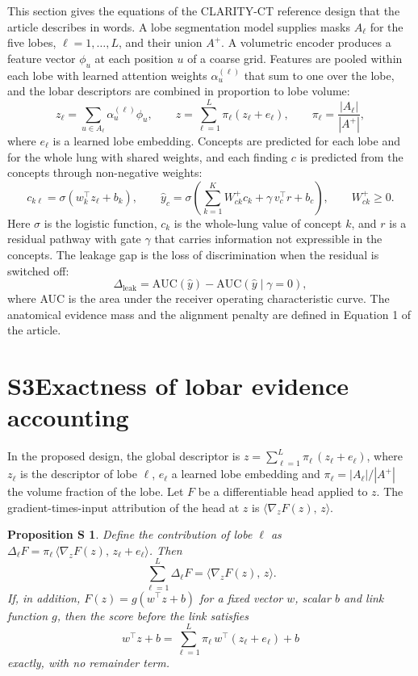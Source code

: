\documentclass[10pt,a4paper]{article}
\newtheorem{proposition}{Proposition S\!}
\theoremstyle{definition}\newtheorem{definition}{Definition S\!}
\theoremstyle{remark}\newtheorem{remark}{Remark S\!}
\begin{document}
This section gives the equations of the CLARITY-CT reference design that the article describes in words. A lobe segmentation model supplies masks $A_\ell$ for the five lobes, $\ell=1,\dots,L$, and their union $A^{+}$. A volumetric encoder produces a feature vector $\phi_u$ at each position $u$ of a coarse grid. Features are pooled within each lobe with learned attention weights $\alpha_u^{(\ell)}$ that sum to one over the lobe, and the lobar descriptors are combined in proportion to lobe volume:
\[
z_\ell=\sum_{u\in A_\ell}\alpha_u^{(\ell)}\phi_u,\qquad z=\sum_{\ell=1}^{L}\pi_\ell\left(z_\ell+e_\ell\right),\qquad \pi_\ell=\frac{|A_\ell|}{|A^{+}|},\tag{S1}
\]
where $e_\ell$ is a learned lobe embedding. Concepts are predicted for each lobe and for the whole lung with shared weights, and each finding $c$ is predicted from the concepts through non-negative weights:
\[
c_{k\ell}=\sigma\left(w_k^{\top}z_\ell+b_k\right),\qquad \hat{y}_c=\sigma\left(\sum_{k=1}^{K}W_{ck}^{+}c_k+\gamma\,v_c^{\top}r+b_c\right),\qquad W_{ck}^{+}\ge 0.\tag{S2}
\]
Here $\sigma$ is the logistic function, $c_k$ is the whole-lung value of concept $k$, and $r$ is a residual pathway with gate $\gamma$ that carries information not expressible in the concepts. The leakage gap is the loss of discrimination when the residual is switched off:
\[
\Delta_{\mathrm{leak}}=\mathrm{AUC}\left(\hat{y}\right)-\mathrm{AUC}\left(\hat{y}\mid\gamma=0\right),\tag{S3}
\]
where AUC is the area under the receiver operating characteristic curve. The anatomical evidence mass and the alignment penalty are defined in Equation 1 of the article.

\section*{S3\quad Exactness of lobar evidence accounting}

In the proposed design, the global descriptor is $z=\sum_{\ell=1}^{L}\pi_\ell\,(z_\ell+e_\ell)$, where $z_\ell$ is the descriptor of lobe $\ell$, $e_\ell$ a learned lobe embedding and $\pi_\ell=|A_\ell|/|A^{+}|$ the volume fraction of the lobe. Let $F$ be a differentiable head applied to $z$. The gradient-times-input attribution of the head at $z$ is $\langle\nabla_z F(z),\,z\rangle$.

\begin{proposition}
Define the contribution of lobe $\ell$ as $\Delta_\ell F=\pi_\ell\,\langle\nabla_z F(z),\,z_\ell+e_\ell\rangle$. Then
\[
\sum_{\ell=1}^{L}\Delta_\ell F=\langle\nabla_z F(z),\,z\rangle .
\]
If, in addition, $F(z)=g\!\left(w^{\top}z+b\right)$ for a fixed vector $w$, scalar $b$ and link function $g$, then the score before the link satisfies
\[
w^{\top}z+b=\sum_{\ell=1}^{L}\pi_\ell\,w^{\top}(z_\ell+e_\ell)+b
\]
exactly, with no remainder term.
\end{proposition}
\end{document}
